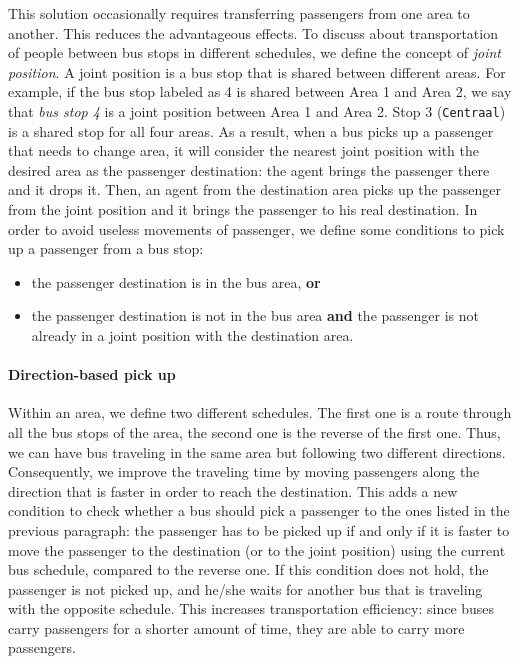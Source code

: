 This solution occasionally requires transferring passengers from one area to another. This reduces the advantageous effects. To discuss about transportation of people between bus stops in different schedules, we define the concept of \textit{joint position}. A joint position is a bus stop that is shared between different areas. For example, if the bus stop labeled as 4 is shared between Area 1 and Area 2, we say that \textit{bus stop 4} is a joint position  between Area 1 and  Area 2. Stop 3 (\texttt{Centraal}) is a shared stop for all four areas. As a result, when a bus picks up a passenger that needs to change area, it will consider the nearest joint position with the desired area as the passenger destination: the agent brings the passenger there and it drops it. Then, an agent from the destination area picks up the passenger from the joint position and it brings the passenger to his real destination. In order to avoid useless movements of passenger, we define some conditions to pick up a passenger from a bus stop:

\begin{itemize}
\item the passenger destination is in the bus area, \textbf{or}
\item the passenger destination is not in the bus area \textbf{and} the passenger is not already in a joint position with the destination area.
\end{itemize}

\paragraph{Direction-based pick up}

Within an area, we define two different schedules. The first one is a route through all the bus stops of the area, the second one is the reverse of the first one. Thus, we can have bus traveling in the same area but following two different directions. Consequently, we improve the traveling time by moving passengers along the direction that is faster in order to reach the destination. This adds a new condition to check whether a bus should pick a passenger to the ones listed in the previous paragraph: the passenger has to be picked up if and only if it is faster to move the passenger to the destination (or to the joint position) using the current bus schedule, compared to the reverse one. If this condition does not hold, the passenger is not picked up, and he/she waits for another bus that is traveling with the opposite schedule. This increases transportation efficiency: since buses carry passengers for a shorter amount of time, they are able to carry more passengers. 

